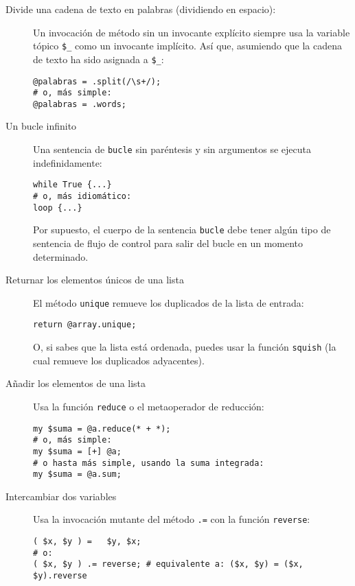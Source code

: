 \begin{description}
\item[Divide una cadena de texto en palabras (dividiendo en espacio):]
Un invocación de método sin un invocante explícito siempre usa 
la variable tópico \verb|$_| como un invocante implícito. 
Así que, asumiendo que la cadena de texto ha sido asignada
a \verb|$_|:

\begin{verbatim}
@palabras = .split(/\s+/);
# o, más simple:
@palabras = .words;
\end{verbatim}

\item[Un bucle infinito] Una sentencia de {\tt bucle} 
sin paréntesis y sin argumentos se ejecuta indefinidamente:

\begin{verbatim}
while True {...}
# o, más idiomático:
loop {...}   
\end{verbatim}

Por supuesto, el cuerpo de la sentencia {\tt bucle} 
debe tener algún tipo de sentencia de flujo de control 
para salir del bucle en un momento determinado.

\item[Returnar los elementos únicos de una lista] El método
{\tt unique} remueve los duplicados de la lista de entrada:

\begin{verbatim}
return @array.unique;
\end{verbatim}

O, si sabes que la lista está ordenada, puedes usar la
función {\tt squish} (la cual remueve los duplicados adyacentes).

\item[Añadir los elementos de una lista] Usa la función 
{\tt reduce} o el metaoperador de reducción:

\begin{verbatim}
my $suma = @a.reduce(* + *);
# o, más simple:
my $suma = [+] @a;
# o hasta más simple, usando la suma integrada:
my $suma = @a.sum;  
\end{verbatim}

\item[Intercambiar dos variables] Usa la invocación
mutante del método \verb|.=| con la función \verb|reverse|:
\begin{verbatim}
( $x, $y ) =   $y, $x;
# o:
( $x, $y ) .= reverse; # equivalente a: ($x, $y) = ($x, $y).reverse
\end{verbatim}


\end{description}
